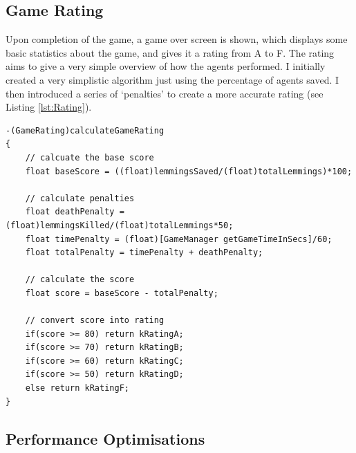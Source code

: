 \documentclass[a4paper,oneside]{report}
\begin{document}
\subsection{Game Rating}

Upon completion of the game, a game over screen is shown, which displays some basic statistics about the game, and gives it a rating from A to F. The rating aims to give a very simple overview of how the agents performed. I initially created a very simplistic algorithm just using the percentage of agents saved. I then introduced a series of `penalties' to create a more accurate rating (see Listing \ref{lst:Rating}). 

\begin{lstlisting}[label={lst:Rating},caption=The Game Rating Algorithm]
-(GameRating)calculateGameRating
{
    // calcuate the base score
    float baseScore = ((float)lemmingsSaved/(float)totalLemmings)*100;
    
    // calculate penalties
    float deathPenalty = (float)lemmingsKilled/(float)totalLemmings*50;
    float timePenalty = (float)[GameManager getGameTimeInSecs]/60;
    float totalPenalty = timePenalty + deathPenalty;
    
    // calculate the score
    float score = baseScore - totalPenalty;
        
    // convert score into rating
    if(score >= 80) return kRatingA;
    if(score >= 70) return kRatingB;
    if(score >= 60) return kRatingC;
    if(score >= 50) return kRatingD;
    else return kRatingF;
}
\end{lstlisting}

\subsection{Performance Optimisations} 
\end{document}
